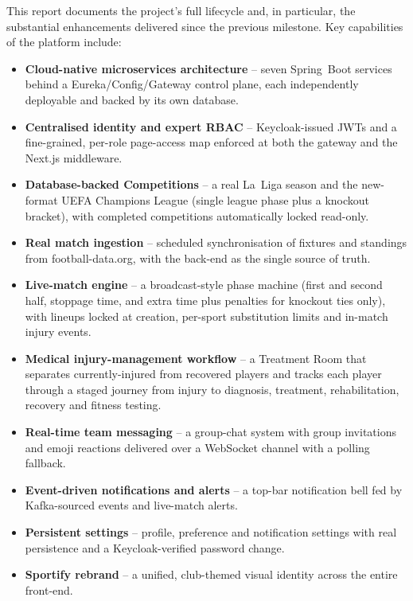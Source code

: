 \documentclass[12pt,a4paper]{report}
\begin{document}
This report documents the project's full lifecycle and, in particular, the
substantial enhancements delivered since the previous milestone. Key capabilities
of the platform include:

\begin{itemize}[leftmargin=1.6em,itemsep=2pt]
  \item \textbf{Cloud-native microservices architecture} -- seven Spring~Boot
        services behind a Eureka/Config/Gateway control plane, each independently
        deployable and backed by its own database.
  \item \textbf{Centralised identity and expert RBAC} -- Keycloak-issued JWTs
        and a fine-grained, per-role page-access map enforced at both the gateway
        and the Next.js middleware.
  \item \textbf{Database-backed Competitions} -- a real La~Liga season and the
        new-format UEFA Champions League (single league phase plus a knockout
        bracket), with completed competitions automatically locked read-only.
  \item \textbf{Real match ingestion} -- scheduled synchronisation of fixtures
        and standings from football-data.org, with the back-end as the single
        source of truth.
  \item \textbf{Live-match engine} -- a broadcast-style phase machine (first and
        second half, stoppage time, and extra time plus penalties for knockout
        ties only), with lineups locked at creation, per-sport substitution
        limits and in-match injury events.
  \item \textbf{Medical injury-management workflow} -- a Treatment Room that
        separates currently-injured from recovered players and tracks each player
        through a staged journey from injury to diagnosis, treatment,
        rehabilitation, recovery and fitness testing.
  \item \textbf{Real-time team messaging} -- a group-chat system with group
        invitations and emoji reactions delivered over a WebSocket channel with a
        polling fallback.
  \item \textbf{Event-driven notifications and alerts} -- a top-bar notification
        bell fed by Kafka-sourced events and live-match alerts.
  \item \textbf{Persistent settings} -- profile, preference and notification
        settings with real persistence and a Keycloak-verified password change.
  \item \textbf{Sportify rebrand} -- a unified, club-themed visual identity across
        the entire front-end.
\end{itemize}
\end{document}
